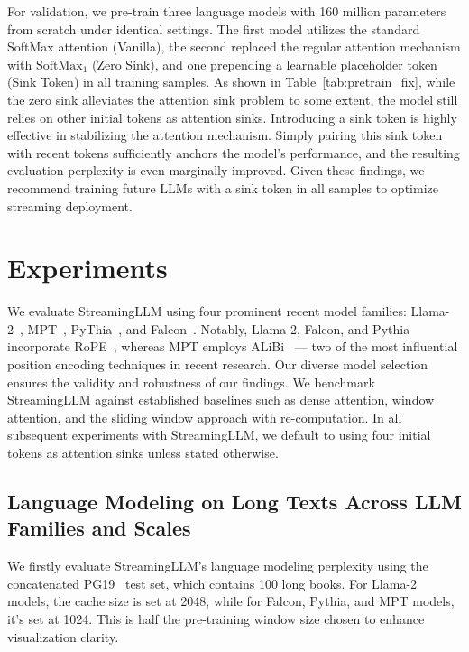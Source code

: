 \documentclass{article} \usepackage{iclr2024_conference,times}
\def\method{StreamingLLM\xspace}
\begin{document}
For validation, we pre-train three language models with 160 million parameters from scratch under identical settings. The first model utilizes the standard SoftMax attention (Vanilla), the second replaced the regular attention mechanism with $\text{SoftMax}_1$ (Zero Sink), and one prepending a learnable placeholder token (Sink Token) in all training samples. As shown in Table~\ref{tab:pretrain_fix}, while the zero sink alleviates the attention sink problem to some extent, the model still relies on other initial tokens as attention sinks. Introducing a sink token is highly effective in stabilizing the attention mechanism. Simply pairing this sink token with recent tokens sufficiently anchors the model's performance, and the resulting evaluation perplexity is even marginally improved. Given these findings, we recommend training future LLMs with a sink token in all samples to optimize streaming deployment.
 \section{Experiments}
\label{sec:exps}
We evaluate \method using four prominent recent model families: Llama-2~\citep{touvron2023llama2}, MPT~\citep{MosaicML2023Introducing}, PyThia~\citep{biderman2023pythia}, and Falcon~\citep{falcon40b}. Notably, Llama-2, Falcon, and Pythia incorporate RoPE~\citep{su2021roformer}, whereas MPT employs ALiBi~\citep{alibi} — two of the most influential position encoding techniques in recent research. Our diverse model selection ensures the validity and robustness of our findings. We benchmark \method against established baselines such as dense attention, window attention, and the sliding window approach with re-computation. In all subsequent experiments with \method, we default to using four initial tokens as attention sinks unless stated otherwise.
\subsection{Language Modeling on Long Texts Across LLM Families and Scales}
We firstly evaluate \method's language modeling perplexity using the concatenated PG19~\citep{Rae2020Compressive} test set, which contains 100 long books. For Llama-2 models, the cache size is set at 2048, while for Falcon, Pythia, and MPT models, it's set at 1024. This is half the pre-training window size chosen to enhance visualization clarity.
\end{document}
